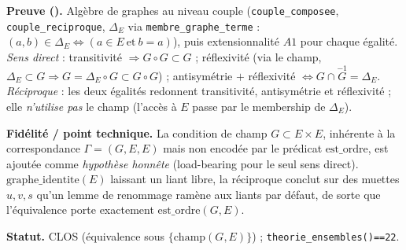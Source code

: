 \textbf{Preuve (\Nstar).} Algèbre de graphes au niveau couple (\texttt{couple\_composee},
\texttt{couple\_reciproque}, $\Delta_E$ via \texttt{membre\_graphe\_terme} : $(a,b)\in\Delta_E
\Leftrightarrow(a\in E\ \text{et}\ b=a)$), puis extensionnalité $A1$ pour chaque égalité.
\emph{Sens direct} : transitivité $\Rightarrow G\circ G\subset G$ ; réflexivité (via le
champ, $\Delta_E\subset G\Rightarrow G=\Delta_E\circ G\subset G\circ G$) ; antisymétrie
$+$ réflexivité $\Leftrightarrow G\cap\overset{-1}{G}=\Delta_E$. \emph{Réciproque} : les
deux égalités redonnent transitivité, antisymétrie et réflexivité ; elle \emph{n'utilise
pas} le champ (l'accès à $E$ passe par le membership de $\Delta_E$).

\textbf{Fidélité / point technique.} La condition de champ $G\subset E\times E$, inhérente
à la correspondance $\Gamma=(G,E,E)$ mais non encodée par le prédicat $\mathrm{est\_ordre}$,
est ajoutée comme \emph{hypothèse honnête} (load-bearing pour le seul sens direct).
$\mathrm{graphe\_identite}(E)$ laissant un liant libre, la réciproque conclut sur des
muettes $u,v,s$ qu'un lemme de renommage ramène aux liants par défaut, de sorte que
l'équivalence porte exactement $\mathrm{est\_ordre}(G,E)$.

\textbf{Statut.} CLOS (équivalence sous $\{\mathrm{champ}(G,E)\}$) ; \texttt{theorie\_ensembles()==22}.
